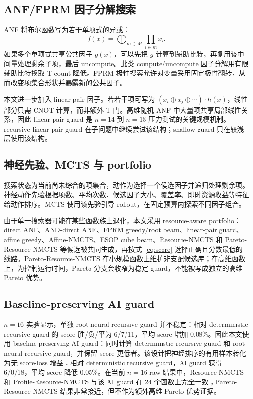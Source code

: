 \documentclass[UTF8,fontset=macnew,11pt]{ctexart}
\newcommand{\method}{Resource-NMCTS}
\newcommand{\pareto}{Pareto-Resource-NMCTS}
\begin{document}
\subsection{ANF/FPRM 因子分解搜索}

ANF 将布尔函数写为若干单项式的异或：
\begin{equation}
  f(x)=\bigoplus_{m\in\mathcal{M}}\prod_{i\in m}x_i .
\end{equation}
如果多个单项式共享公共因子 $g(x)$，可以先把 $g$ 计算到辅助比特，再复用该中间量处理剩余子项，最后 uncompute。此类 compute/uncompute 因子分解用有限辅助比特换取 T-count 降低。FPRM 极性搜索允许对变量采用固定极性翻转，从而改变项集合形状并暴露新的公共因子。

本文进一步加入 linear-pair 因子。若若干项可写为 $(x_i\oplus x_j\oplus\cdots)\cdot h(x)$，线性部分只需 CNOT 计算，而非额外 T 门。高维随机 ANF 中大量项共享局部线性关系，因此 linear-pair guard 是 $n=14$ 到 $n=18$ 压力测试的关键规模机制。recursive linear-pair guard 在子问题中继续尝试该结构；shallow guard 只在较浅层使用该结构。

\subsection{神经先验、MCTS 与 portfolio}

搜索状态为当前尚未综合的项集合，动作为选择一个候选因子并递归处理剩余项。神经动作先验根据项数、平均次数、候选因子大小、覆盖率、即时资源收益等特征给动作排序。MCTS 使用该先验引导 rollout，在固定预算内探索不同因子组合。

由于单一搜索器可能在某些函数族上退化，本文采用 resource-aware portfolio：direct ANF、AND-direct ANF、FPRM greedy/root beam、linear-pair guard、affine greedy、Affine-NMCTS、ESOP cube beam、\method{} 和 \pareto{} 等候选被共同生成，再按式~\eqref{eq:score} 选择正确且分数最低的线路。\pareto{} 在小规模函数上维护非支配候选库；在高维函数上，为控制运行时间，Pareto 分支会收窄为稳定 guard，不能被写成独立的高维 Pareto 优势。

\subsection{Baseline-preserving AI guard}

$n=16$ 实验显示，单独 root-neural recursive guard 并不稳定：相对 deterministic recursive guard 的 score 胜/负/平为 6/7/11，平均 score 增加 0.08\%。因此本文使用 baseline-preserving AI guard：同时计算 deterministic recursive guard 和 root-neural recursive guard，并保留 score 更低者。该设计把神经排序的有用样本转化为无 score-loss 增益：相对 deterministic recursive guard，AI guard 获得 6/0/18，平均 score 降低 0.05\%。在当前 $n=16$ raw 结果中，\method{} 和 Profile-\method{} 与该 AI guard 在 24 个函数上完全一致；\pareto{} 结果非常接近，但不作为额外高维 Pareto 优势证据。
\end{document}
